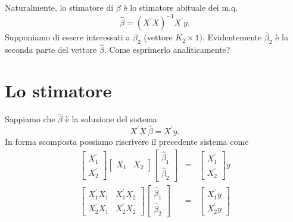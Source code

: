 \documentclass[a4paper]{report}
\theoremstyle{remark}
\begin{document}
\noindent Naturalmente, lo stimatore di $\beta $ \`{e} lo stimatore abituale
dei m.q.%
\begin{equation*}
\widehat{\beta }=\left( X^{\prime }X\right) ^{-1}X^{\prime }y.
\end{equation*}%
Supponiamo di essere interessati a $\beta _{2}$ (vettore $K_{2}\times 1)$.
Evidentemente $\widehat{\beta }_{2}$ \`{e} la seconda parte del vettore $%
\widehat{\beta }$. Come esprimerlo analiticamente?

\section{Lo stimatore}

Sappiamo che $\widehat{\beta }$ \`{e} la soluzione del sistema%
\begin{equation*}
X^{\prime }X\ \widehat{\beta }=X^{\prime }y.
\end{equation*}%
In forma scomposta possiamo riscrivere il precedente sistema come%
\begin{eqnarray*}
\left[ 
\begin{array}{c}
X_{1}^{\prime } \\ 
X_{2}^{\prime }%
\end{array}%
\right] \left[ 
\begin{array}{cc}
X_{1} & X_{2}%
\end{array}%
\right] \left[ 
\begin{array}{c}
\widehat{\beta }_{1} \\ 
\widehat{\beta }_{2}%
\end{array}%
\right] &=&\left[ 
\begin{array}{c}
X_{1}^{\prime } \\ 
X_{2}^{\prime }%
\end{array}%
\right] y \\
\left[ 
\begin{array}{cc}
X_{1}^{\prime }X_{1} & X_{1}^{\prime }X_{2} \\ 
X_{2}^{\prime }X_{1} & X_{2}^{\prime }X_{2}%
\end{array}%
\right] \left[ 
\begin{array}{c}
\widehat{\beta }_{1} \\ 
\widehat{\beta }_{2}%
\end{array}%
\right] &=&\left[ 
\begin{array}{c}
X_{1}^{\prime }y \\ 
X_{2}^{\prime }y%
\end{array}%
\right]
\end{eqnarray*}%
\end{document}
